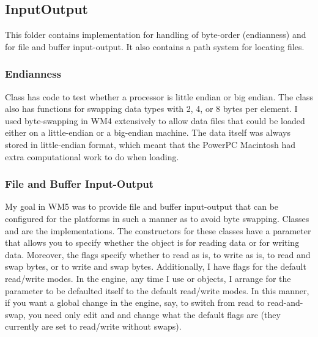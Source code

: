 \documentclass{article}
\begin{document}
\subsection{InputOutput}

This folder contains implementation for handling of byte-order (endianness)
and for file and buffer input-output.  It also contains a path system for
locating files.

\subsubsection{Endianness}

Class  has code to test whether a processor is little endian
or big endian.  The class also has functions for swapping data types with
2, 4, or 8 bytes per element.  I used byte-swapping in WM4 extensively to
allow data files that could be loaded either on a little-endian or a
big-endian machine.  The data itself was always stored in little-endian
format, which meant that the PowerPC Macintosh had extra computational
work to do when loading.

\subsubsection{File and Buffer Input-Output}

My goal in WM5 was to provide file and buffer input-output that can be
configured for the platforms in such a manner as to avoid byte swapping.
Classes  and  are the implementations.  The
constructors for these classes have a  parameter that allows
you to specify whether the object is for reading data or for writing
data.  Moreover, the  flags specify whether to read as is,
to write as is, to read and swap bytes, or to write and swap bytes.
Additionally, I have  flags for the default read/write modes.
In the engine, any time I use  or  objects,
I arrange for the  parameter to be defaulted itself to the
default read/write modes.  In this manner, if you want a global change
in the engine, say, to switch from read to read-and-swap, you need only
edit  and  and change what the
default flags are (they currently are set to read/write without swaps).
\end{document}
